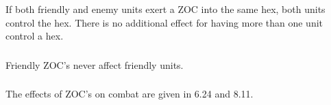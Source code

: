 \subsubsection[Competing ZOCs]{} If both friendly and enemy units exert a ZOC into the same hex, both units control the hex. There is no additional effect for having more than one unit control a hex.

\subsubsection[Friendly ZOCs]{} Friendly ZOC's never affect friendly units.

\subsubsection[ZOCs and Combat]{} The effects of ZOC's on combat are given in 6.24 and 8.11.
